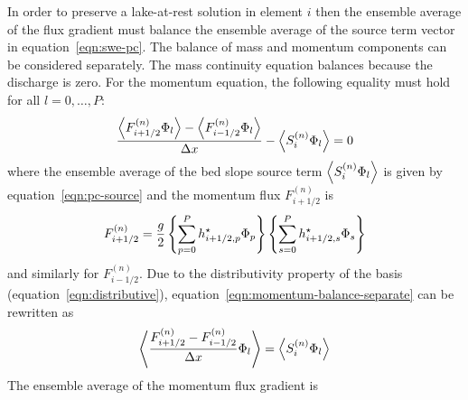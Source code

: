 In order to preserve a lake-at-rest solution in element $i$ then the ensemble average of the flux gradient must balance the ensemble average of the source term vector in equation~\eqref{eqn:swe-pc}.
The balance of mass and momentum components can be considered separately.
The mass continuity equation balances because the discharge is zero.
For the momentum equation, the following equality must hold for all $l = 0, \ldots, P$:
\begin{align}
\frac{\left\langle F_{i+1/2}^{(n)} \Phi_l \right\rangle - \left\langle F_{i-1/2}^{(n)} \Phi_l \right\rangle}{\Delta x}
-
\left\langle S_i^{(n)} \Phi_l \right\rangle
= 0
\label{eqn:momentum-balance-separate}
\end{align}
where the ensemble average of the bed slope source term $\left\langle S_i^{(n)} \Phi_l \right\rangle$ is given by equation~\eqref{eqn:pc-source} and the momentum flux $F_{i+1/2}^{(n)}$ is
\begin{align}
F_{i+1/2}^{(n)} = \frac{g}{2}
\left\{\sum_{p=0}^P h^\star_{i+1/2,p} \Phi_p\right\}
\left\{\sum_{s=0}^P h^\star_{i+1/2,s} \Phi_s\right\}
\end{align}
and similarly for $F_{i-1/2}^{(n)}$.
Due to the distributivity property of the basis (equation~\ref{eqn:distributive}), equation~\eqref{eqn:momentum-balance-separate} can be rewritten as
\begin{align}
\left\langle \frac{F_{i+1/2}^{(n)} 
-
F_{i-1/2}^{(n)}}{\Delta x} \Phi_l \right\rangle
=
\left\langle  S_i^{(n)} \Phi_l \right\rangle
\label{eqn:momentum-balance}
\end{align}
The ensemble average of the momentum flux gradient is
